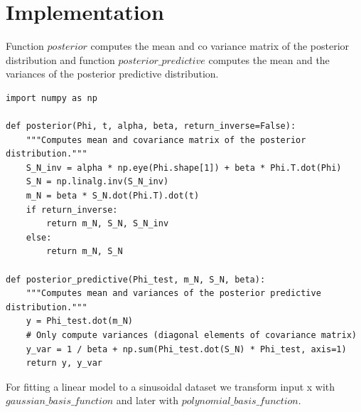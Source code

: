 \documentclass[journal,12pt,twocolumn]{IEEEtran}
\begin{document}
\section{Implementation}
Function $posterior$ computes the mean and co variance matrix of the posterior distribution and function $posterior\_predictive$ computes the mean and the variances of the posterior predictive distribution.
\begin{lstlisting}
import numpy as np

def posterior(Phi, t, alpha, beta, return_inverse=False):
    """Computes mean and covariance matrix of the posterior distribution."""
    S_N_inv = alpha * np.eye(Phi.shape[1]) + beta * Phi.T.dot(Phi)
    S_N = np.linalg.inv(S_N_inv)
    m_N = beta * S_N.dot(Phi.T).dot(t)
    if return_inverse:
        return m_N, S_N, S_N_inv
    else:
        return m_N, S_N

def posterior_predictive(Phi_test, m_N, S_N, beta):
    """Computes mean and variances of the posterior predictive distribution."""
    y = Phi_test.dot(m_N)
    # Only compute variances (diagonal elements of covariance matrix)
    y_var = 1 / beta + np.sum(Phi_test.dot(S_N) * Phi_test, axis=1)
    return y, y_var
\end{lstlisting}
For fitting a linear model to a sinusoidal dataset we transform input x with $gaussian\_basis\_function$ and later with $polynomial\_basis\_function$. 
\end{document}
